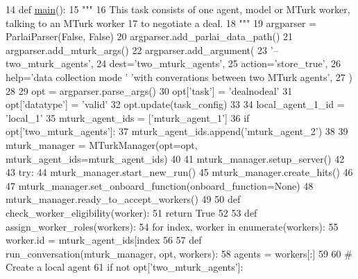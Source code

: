 \begin{DoxyCode}
14 \textcolor{keyword}{def }\hyperlink{namespaceprojects_1_1wizard__of__wikipedia_1_1mturk__evaluation__task_1_1run_ad3ab2c71f8083c3112815c0b363d316b}{main}():
15     \textcolor{stringliteral}{"""}
16 \textcolor{stringliteral}{    This task consists of one agent, model or MTurk worker, talking to an MTurk worker}
17 \textcolor{stringliteral}{    to negotiate a deal.}
18 \textcolor{stringliteral}{    """}
19     argparser = ParlaiParser(\textcolor{keyword}{False}, \textcolor{keyword}{False})
20     argparser.add\_parlai\_data\_path()
21     argparser.add\_mturk\_args()
22     argparser.add\_argument(
23         \textcolor{stringliteral}{'--two\_mturk\_agents'},
24         dest=\textcolor{stringliteral}{'two\_mturk\_agents'},
25         action=\textcolor{stringliteral}{'store\_true'},
26         help=\textcolor{stringliteral}{'data collection mode '} \textcolor{stringliteral}{'with converations between two MTurk agents'},
27     )
28 
29     opt = argparser.parse\_args()
30     opt[\textcolor{stringliteral}{'task'}] = \textcolor{stringliteral}{'dealnodeal'}
31     opt[\textcolor{stringliteral}{'datatype'}] = \textcolor{stringliteral}{'valid'}
32     opt.update(task\_config)
33 
34     local\_agent\_1\_id = \textcolor{stringliteral}{'local\_1'}
35     mturk\_agent\_ids = [\textcolor{stringliteral}{'mturk\_agent\_1'}]
36     \textcolor{keywordflow}{if} opt[\textcolor{stringliteral}{'two\_mturk\_agents'}]:
37         mturk\_agent\_ids.append(\textcolor{stringliteral}{'mturk\_agent\_2'})
38 
39     mturk\_manager = MTurkManager(opt=opt, mturk\_agent\_ids=mturk\_agent\_ids)
40 
41     mturk\_manager.setup\_server()
42 
43     \textcolor{keywordflow}{try}:
44         mturk\_manager.start\_new\_run()
45         mturk\_manager.create\_hits()
46 
47         mturk\_manager.set\_onboard\_function(onboard\_function=\textcolor{keywordtype}{None})
48         mturk\_manager.ready\_to\_accept\_workers()
49 
50         \textcolor{keyword}{def }check\_worker\_eligibility(worker):
51             \textcolor{keywordflow}{return} \textcolor{keyword}{True}
52 
53         \textcolor{keyword}{def }assign\_worker\_roles(workers):
54             \textcolor{keywordflow}{for} index, worker \textcolor{keywordflow}{in} enumerate(workers):
55                 worker.id = mturk\_agent\_ids[index %
56 
57         \textcolor{keyword}{def }run\_conversation(mturk\_manager, opt, workers):
58             agents = workers[:]
59 
60             \textcolor{comment}{# Create a local agent}
61             \textcolor{keywordflow}{if} \textcolor{keywordflow}{not} opt[\textcolor{stringliteral}{'two\_mturk\_agents'}]:

\end{DoxyCode}
